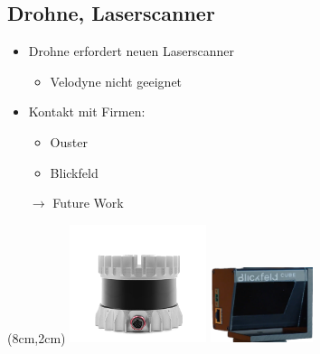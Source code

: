 \documentclass{beamer}
\begin{document}
\subsection{Drohne, Laserscanner}
\begin{frame}{\subsecname}
\begin{itemize}
\item{Drohne erfordert neuen Laserscanner}
\begin{itemize}
\item{Velodyne nicht geeignet}
\end{itemize}
\item{Kontakt mit Firmen:}
\begin{itemize}
\item{Ouster}
\item{Blickfeld}
\end{itemize}
\item[$\rightarrow$]{Future Work}
\end{itemize}
\begin{textblock*}{4cm}(8cm,2cm)
\centering
\includegraphics[width=4cm]{images/ouster.png}
\includegraphics[width=3cm]{images/blickfeld.png}
\end{textblock*}
\end{frame}
\end{document}
